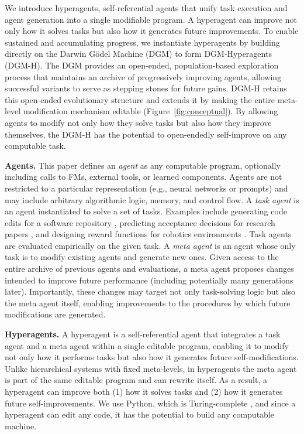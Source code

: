 We introduce hyperagents, self-referential agents that unify task execution and agent generation into a single modifiable program. A hyperagent can improve not only how it solves tasks but also how it generates future improvements. To enable sustained and accumulating progress, we instantiate hyperagents by building directly on the Darwin G\"{o}del Machine (DGM) to form DGM-Hyperagents (DGM-H). The DGM provides an open-ended, population-based exploration process that maintains an archive of progressively improving agents, allowing successful variants to serve as stepping stones for future gains. DGM-H retains this open-ended evolutionary structure and extends it by making the entire meta-level modification mechanism editable (Figure~\ref{fig:conceptual}). By allowing agents to modify not only how they solve tasks but also how they improve themselves, the DGM-H has the potential to open-endedly self-improve on any computable task.

\textbf{Agents.} This paper defines an \textit{agent} as any computable program, optionally including calls to FMs, external tools, or learned components. Agents are not restricted to a particular representation (e.g., neural networks or prompts) and may include arbitrary algorithmic logic, memory, and control flow.
A \textit{task agent} is an agent instantiated to solve a set of tasks. Examples include generating code edits for a software repository \citep{gauthier2024polyglot, jimenez2024swebench}, predicting acceptance decisions for research papers \citep{couto2024relevai}, and designing reward functions for robotics environments \citep{maeureka}. Task agents are evaluated empirically on the given task.
A \textit{meta agent} is an agent whose only task is to modify existing agents and generate new ones. Given access to the entire archive of previous agents and evaluations, a meta agent proposes changes intended to improve future performance (including potentially many generations later). Importantly, these changes may target not only task-solving logic but also the meta agent itself, enabling improvements to the procedures by which future modifications are generated.

\textbf{Hyperagents.} A hyperagent is a self-referential agent that integrates a task agent and a meta agent within a single editable program, enabling it to modify not only how it performs tasks but also how it generates future self-modifications. Unlike hierarchical systems with fixed meta-levels, in hyperagents the meta agent is part of the same editable program and can rewrite itself. As a result, a hyperagent can improve both (1) how it solves tasks and (2) how it generates future self-improvements. We use Python, which is Turing-complete \citep{turing1936computable}, and since a hyperagent can edit any code, it has the potential to build any computable machine.

